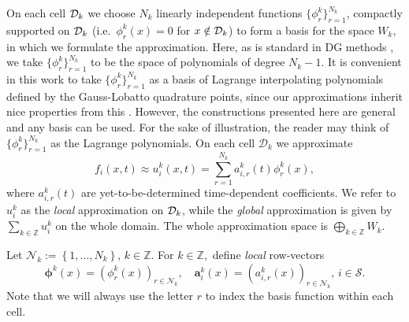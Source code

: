 On each cell \(\mathcal{D}_k\) we choose \(N_k\) linearly independent functions \(\{\phi_r^k\}_{r=1}^{N_k}\), compactly supported on \(\mathcal{D}_k\) (i.e.~\(\phi_r^k(x)=0\) for \(x\notin\mathcal{D}_k\)) to form a basis for the space \(W_k\), in which we formulate the approximation. Here, as is standard in DG methods \citep{nodalDGBook}, we take \(\{\phi_r^k\}_{r=1}^{N_k}\) to be the space of polynomials of degree \(N_k-1\). It is convenient in this work to take \(\{\phi_r^k\}_{r=1}^{N_k}\) as a basis of Lagrange interpolating polynomials defined by the Gauss-Lobatto quadrature points, since our approximations inherit nice properties from this \citep{nodalDGBook}. However, the constructions presented here are general and any basis can be used. For the sake of illustration, the reader may think of \(\{\phi_r^k\}_{r=1}^{N_k}\) as the Lagrange polynomials. On each cell \(\mathcal D_k\) we approximate 
\[f_i(x,t)\approx u_i^k(x,t)=\sum\limits_{r=1}^{N_k}a_{i,r}^k(t)\phi_r^k(x),\] 
where \(a_{i,r}^k(t)\) are yet-to-be-determined time-dependent coefficients. We refer to \(u_i^k\) as the \textit{local} approximation on \(\mathcal{D}_k\), while the \textit{global} approximation is given by \(\sum\limits_{k\in\mathbb Z}u_i^k\) on the whole domain. The whole approximation space is \(\bigoplus\limits_{k\in\mathbb Z} W_k\).

Let \(\mathcal N_k := \left\{1,\dots,N_k\right\},\, k \in \mathbb Z\). For \(k\in\mathbb Z,\) define \textit{local} row-vectors 
\[\boldsymbol \phi^k(x) = (\phi_r^k(x))_{r\in\mathcal N_k}, \quad \boldsymbol a_i^k(x) = (a_{i,r}^k(x))_{r\in\mathcal N_k},\,i\in\mathcal S.\]
Note that we will always use the letter \(r\) to index the basis function within each cell.

